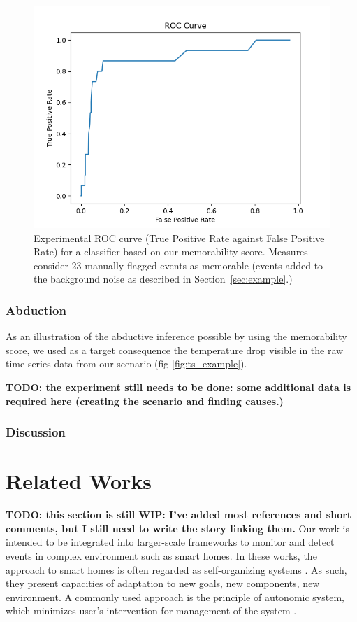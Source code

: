 \documentclass[conference]{IEEEtran}
\begin{document}
\begin{figure}[ht]
  \centering
  \includegraphics[width=\linewidth]{./figures/roc}
  \caption{Experimental ROC curve (True Positive Rate against False Positive
   Rate) for a classifier based on our memorability score. Measures consider 23
   manually flagged events as memorable (events added to the background noise
   as described in Section~\ref{sec:example}.)}
  \label{fig:roc}
\end{figure}
\subsubsection{Abduction}

As an illustration of the abductive inference possible by using the memorability
score, we used as a target consequence the temperature drop visible in the raw
time series data from our scenario (fig \ref{fig:ts_example}).

\textbf{TODO: the experiment still needs to be done: some additional data is required here (creating the scenario and finding causes.)}


\subsubsection{Discussion}
\label{ssub:discussion}

\section{Related Works}
\label{sec:related}
\textbf{TODO: this section is still WIP: I've added most references and short comments, but I still need to write the story linking them.}
Our work is intended to be integrated into larger-scale frameworks to monitor 
and detect events in complex environment such as smart homes. In these works, the
approach to smart homes is often regarded as self-organizing systems \cite{kramer_rigorous_2009,kounev_notion_2017}. As such, they present capacities of adaptation to new goals, 
new components, new environment. A commonly used approach is the principle of 
autonomic system, which minimizes user's intervention for management of the 
system \cite{kounev_notion_2017,kephart_vision_2003}.
\end{document}
